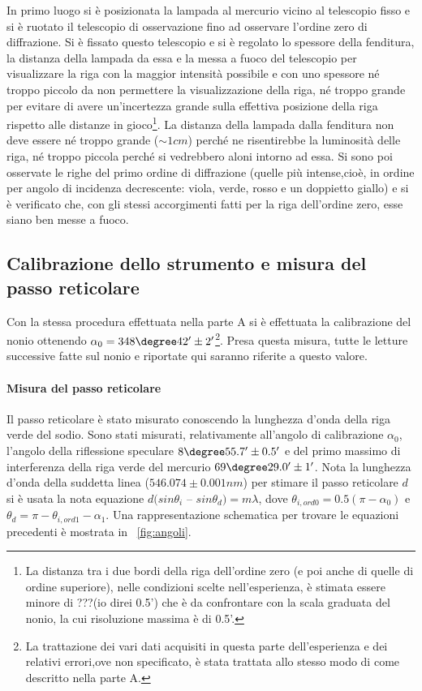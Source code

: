 \documentclass[a4paper,10pt]{article}
\begin{document}
{{{{{{In primo luogo si è posizionata la lampada al mercurio vicino al telescopio fisso e si è ruotato il telescopio di osservazione fino ad osservare l'ordine zero di diffrazione. Si è fissato questo telescopio e si è regolato lo spessore della fenditura, la distanza della lampada da essa e la messa a fuoco del telescopio per visualizzare la riga con la maggior intensità possibile e con uno spessore né troppo piccolo da non permettere la visualizzazione della riga, né troppo grande per evitare di avere un'incertezza grande sulla effettiva posizione della riga rispetto alle distanze in gioco\footnote{La distanza tra i due bordi della riga dell'ordine zero (e poi anche di quelle di ordine superiore), nelle condizioni scelte nell'esperienza, è stimata essere minore di ???(io direi 0.5') che è da confrontare con la scala graduata del nonio, la cui risoluzione massima è di 0.5'.}.
La distanza della lampada dalla fenditura non deve essere né troppo grande ($\sim 1 cm$) perché ne risentirebbe la luminosità delle riga, né troppo piccola perché si vedrebbero aloni intorno ad essa.
Si sono poi osservate le righe del primo ordine di diffrazione (quelle più intense,cioè, in ordine per angolo di incidenza decrescente: viola, verde, rosso e un doppietto giallo) e si è verificato che, con gli stessi accorgimenti fatti per la riga dell'ordine zero, esse siano ben messe a fuoco.

\subsection{Calibrazione dello strumento e misura del passo reticolare}
Con la stessa procedura effettuata nella parte A si è effettuata la calibrazione del nonio ottenendo $\alpha_0 = 348\degree 42' \pm  2' $\footnote{La trattazione dei vari dati acquisiti in questa parte dell'esperienza e dei relativi errori,ove non specificato, è stata trattata allo stesso modo di come descritto nella parte A.}. Presa questa misura, tutte le letture successive fatte sul nonio e riportate qui saranno riferite a questo valore.


\paragraph{Misura del passo reticolare}
Il passo reticolare è stato misurato conoscendo la lunghezza d'onda della riga verde del sodio. Sono stati misurati, relativamente all'angolo di calibrazione $\alpha_0$, l'angolo della riflessione speculare $8\degree 55.7' \pm 0.5'$ e del primo massimo di interferenza della riga verde del mercurio $69\degree 29.0'\pm 1'$. Nota la lunghezza d'onda della suddetta linea ($546.074 \pm 0.001 nm$) per stimare il passo reticolare $d$ si è usata la nota equazione $d(sin \theta_i$ – $sin \theta_d) = m\lambda$, dove $\theta_{i,ord0} =0.5(\pi - \alpha_0)$ e $\theta_d = \pi - \theta_{i,ord1} - \alpha_1$. Una rappresentazione schematica per trovare le equazioni precedenti è mostrata in \figurename{~\ref{fig:angoli}}.


}}}}}}
\end{document}
